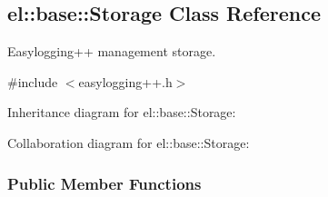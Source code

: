 \hypertarget{a00086}{}\subsection{el\+:\+:base\+:\+:Storage Class Reference}
\label{a00086}


Easylogging++ management storage.  




{\ttfamily \#include $<$easylogging++.\+h$>$}



Inheritance diagram for el\+:\+:base\+:\+:Storage\+:


Collaboration diagram for el\+:\+:base\+:\+:Storage\+:
\subsubsection*{Public Member Functions}
